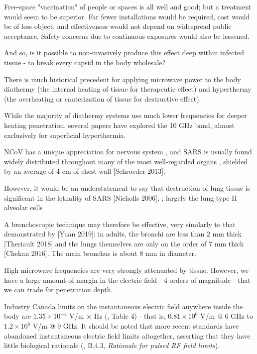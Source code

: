 \documentclass[paper.tex]{subfiles}
\begin{document}
Free-space "vaccination" of people or spaces is all well and good; but a treatment would seem to be superior. Far fewer installations would be required, cost would be of less object, and effectiveness would not depend on widespread public acceptance. Safety concerns due to continuous exposures would also be lessened.

And so, is it possible to non-invasively produce this effect deep within infected tissue - to break every capsid in the body wholesale?

There is much historical precedent for applying microwave power to the body diathermy (the internal heating of tissue for therapeutic effect) and hyperthermy (the overheating or cauterization of tissue for destructive effect). 

While the majority of diathermy systems use much lower frequencies for deeper heating penetration, several papers have explored the 10 GHz band, almost exclusively for superficial hyperthermia.

NCoV has a unique appreciation for nervous system \cite{neuroinvasive2020}, and SARS is usually found widely distributed throughout many of the most well-regarded organs \cite{Organ2004}, shielded by an average of 4 cm of chest wall [Schroeder 2013]. 

However, it would be an understatement to say that destruction of lung tissue is significant in the lethality of SARS [Nicholls 2006], \cite{situ2020}; largely the lung type II alveolar cells 



A bronchoscopic technique may therefore be effective, very similarly to that demonstrated by [Yuan 2019]: in adults, the bronchi are less than 2 mm thick [Theriault 2018] and the lungs themselves are only on the order of 7 mm thick [Chekan 2016]. The main bronchus is about 8 mm in diameter.

High microwave frequencies are very strongly attenuated by tissue. However, we have a large amount of margin in the electric field - 4 orders of magnitude - that we can trade for penetration depth.

Industry Canada limits on the instantaneous electric field anywhere inside the body are $1.35 \times 10^{-4}$ V/m $\times$ Hz (\cite{RSS1022015}, Table 4) - that is, $0.81 \times 10^6$ V/m @ 6 GHz to $1.2 \times 10^6$ V/m @ 9 GHz. It should be noted that more recent standards have abandoned instantaneous electric field limits altogether, asserting that they have little biological rationale (\cite{C95}, B.4.3, {\it Rationale for pulsed RF field limits}).\footnotemark
\end{document}
